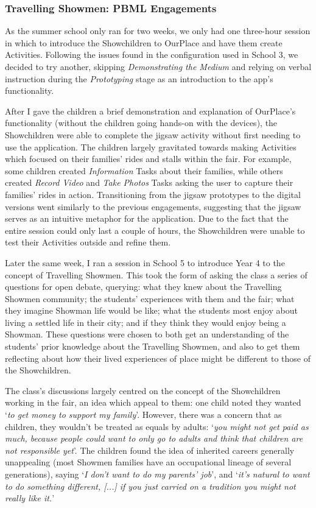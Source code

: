 \subsubsection{Travelling Showmen: PBML Engagements}
As the summer school only ran for two weeks, we only had one three-hour session in which to introduce the Showchildren to OurPlace and have them create Activities. Following the issues found in the configuration used in School 3, we decided to try another, skipping \textit{Demonstrating the Medium} and relying on verbal instruction during the \textit{Prototyping} stage as an introduction to the app's functionality. 

After I gave the children a brief demonstration and explanation of OurPlace's functionality (without the children going hands-on with the devices), the Showchildren were able to complete the jigsaw activity without first needing to use the application. The children largely gravitated towards making Activities which focused on their families' rides and stalls within the fair. For example, some children created \textit{Information} Tasks about their families, while others created \textit{Record Video} and \textit{Take Photos} Tasks asking the user to capture their families' rides in action. Transitioning from the jigsaw prototypes to the digital versions went similarly to the previous engagements, suggesting that the jigsaw serves as an intuitive metaphor for the application. Due to the fact that the entire session could only last a couple of hours, the Showchildren were unable to test their Activities outside and refine them.

Later the same week, I ran a session in School 5 to introduce Year 4 to the concept of Travelling Showmen. This took the form of asking the class a series of questions for open debate, querying: what they knew about the Travelling Showmen community; the students' experiences with them and the fair; what they imagine Showman life would be like; what the students most enjoy about living a settled life in their city; and if they think they would enjoy being a Showman. These questions were chosen to both get an understanding of the students' prior knowledge about the Travelling Showmen, and also to get them reflecting about how their lived experiences of place might be different to those of the Showchildren.

The class's discussions largely centred on the concept of the Showchildren working in the fair, an idea which appeal to them: one child noted they wanted `\textit{to get money to support my family}'. However, there was a concern that as children, they wouldn't be treated as equals by adults: `\textit{you might not get paid as much, because people could want to only go to adults and think that children are not responsible yet}'. The children found the idea of inherited careers generally unappealing (most Showmen families have an occupational lineage of several generations), saying `\textit{I don't want to do my parents' job}', and `\textit{it's natural to want to do something different, [...] if you just carried on a tradition you might not really like it.}' 

